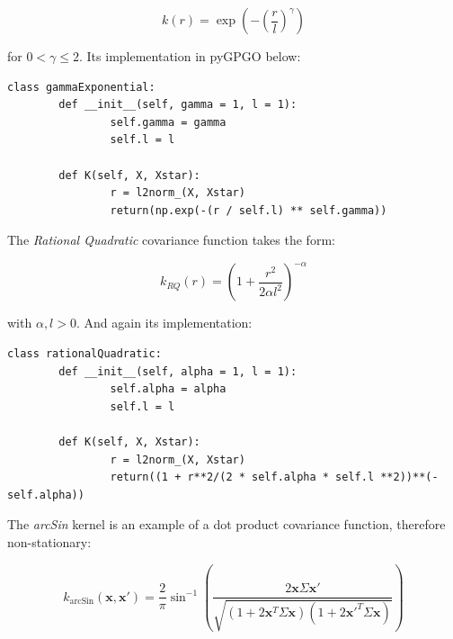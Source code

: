 \documentclass[10pt,a4paper,twoside]{book}
\begin{document}
\begin{equation}
k(r) = \exp\left( - \left(\dfrac{r}{l}\right)^\gamma  \right)
\end{equation}

for $0 < \gamma \leq 2$. Its implementation in pyGPGO below:

\begin{verbatim}               
class gammaExponential:
        def __init__(self, gamma = 1, l = 1):
                self.gamma = gamma
                self.l = l

        def K(self, X, Xstar):
                r = l2norm_(X, Xstar)
                return(np.exp(-(r / self.l) ** self.gamma))              
\end{verbatim}

The \textit{Rational Quadratic} covariance function takes the form:

\begin{equation}
k_{RQ}(r) = \left( 1 + \dfrac{r^2}{2\alpha l^2} \right)^{-\alpha}
\end{equation}

with $\alpha, l > 0$. And again its implementation:

\begin{verbatim}
class rationalQuadratic:
        def __init__(self, alpha = 1, l = 1):
                self.alpha = alpha
                self.l = l

        def K(self, X, Xstar):
                r = l2norm_(X, Xstar)
                return((1 + r**2/(2 * self.alpha * self.l **2))**(-self.alpha))  
\end{verbatim}

The \textit{arcSin} kernel is an example of a dot product covariance function, therefore non-stationary:

\begin{equation}
k_{\textrm{arcSin}}(\boldsymbol{x}, \boldsymbol{x'}) = \dfrac{2}{\pi}\sin^{-1}\left(\dfrac{2\boldsymbol{x}\Sigma\boldsymbol{x'}}{\sqrt{(1 + 2\boldsymbol{x}^T\Sigma\boldsymbol{x})(1 + 2\boldsymbol{x'}^T\Sigma\boldsymbol{x})}}   \right)
\end{equation}
\end{document}
